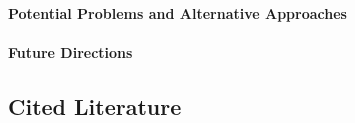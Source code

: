 \begin{enumerate}
\paragraph{Potential Problems and Alternative
      Approaches}\label{potential-problems-and-alternative-approaches}

\paragraph{Future Directions}\label{future-directions} 
    
\subsection{Cited Literature}\label{cited-literature}

\end{enumerate}